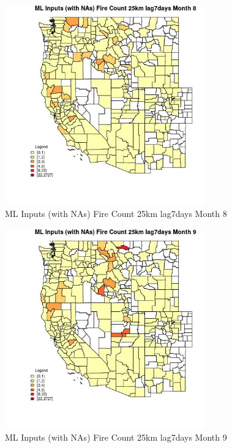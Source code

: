 \begin{figure} 
\centering  
\includegraphics[width=0.77\textwidth]{Code_Outputs/Report_ML_input_PM25_Step4_part_f_de_duplicated_aves_prioritize_24hr_obswNAs_CountyFire_Count_25km_lag7daysmedianMonth8.jpg} 
\caption{\label{fig:Report_ML_input_PM25_Step4_part_f_de_duplicated_aves_prioritize_24hr_obswNAsCountyFire_Count_25km_lag7daysmedianMonth8}ML Inputs (with NAs) Fire Count 25km lag7days Month 8} 
\end{figure} 
 

\begin{figure} 
\centering  
\includegraphics[width=0.77\textwidth]{Code_Outputs/Report_ML_input_PM25_Step4_part_f_de_duplicated_aves_prioritize_24hr_obswNAs_CountyFire_Count_25km_lag7daysmedianMonth9.jpg} 
\caption{\label{fig:Report_ML_input_PM25_Step4_part_f_de_duplicated_aves_prioritize_24hr_obswNAsCountyFire_Count_25km_lag7daysmedianMonth9}ML Inputs (with NAs) Fire Count 25km lag7days Month 9} 
\end{figure} 
 

